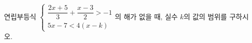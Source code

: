 연립부등식 $\begin{cases} \dfrac{2x+5}{3}+\dfrac{x-3}{2}>-1 \\[4pt] 5x-7<4(x-k) \end{cases}$의 해가 없을 때, 실수 $k$의 값의 범위를 구하시오.
